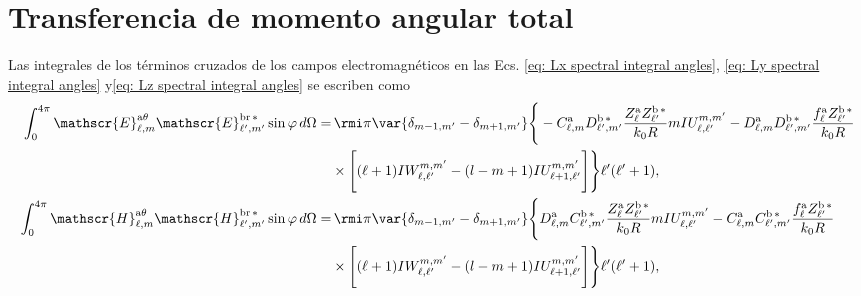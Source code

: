 \section{Transferencia de momento angular total}
Las integrales de los términos cruzados de los campos electromagnéticos en las Ecs. \eqref{eq: Lx spectral integral angles}, \eqref{eq: Ly spectral integral angles} y\eqref{eq: Lz spectral integral angles} se escriben como
\begin{align}
\int_{0}^{4\pi} \mathscr{E}_{\ell, m}^{\text{a}\theta}\mathscr{E}_{\ell^{\prime}, m^{\prime}}^{\text{br}\,*} \sin\varphi \, d\Omega =& 
%
\, \rmi \pi \var{ \delta_{m-1, m^{\prime}} - \delta_{m+1, m^{\prime}} } \Bigg\{-C_{\ell,m}^{\rm a}D_{\ell^{\prime}, m^{\prime}}^{\rm b \, *}\frac{Z_{\ell}^{\rm a}Z_{\ell^{\prime}}^{\rm b\, *}}{k_0 R} m IU_{\ell, \ell^{\prime}}^{m, m^{\prime}} 
%
-D_{\ell, m}^{\rm a}D_{\ell^{\prime}, m^{\prime}}^{\rm b \, *} \frac{f_{\ell}^{\rm a}Z_{\ell^{\prime}}^{\rm b \, *}}{k_0 R} \nonumber \\
%
& \times \Bigg[ (\ell+1) IW_{\ell, \ell^{\prime}}^{m, m^{\prime}} 
%
-(l-m+1) IU_{\ell + 1, \ell^{\prime}}^{m, m^{\prime}} \Bigg] \Bigg\}\ell^{\prime}(\ell^{\prime}+1),\\
%
%
\int_{0}^{4\pi} \mathscr{H}_{\ell, m}^{\text{a}\theta}\mathscr{H}_{\ell^{\prime}, m^{\prime}}^{\text{br}\,*} \sin\varphi \, d\Omega =& 
%
\, \rmi \pi \var{ \delta_{m-1, m^{\prime}} - \delta_{m+1, m^{\prime}} } \Bigg\{D_{\ell,m}^{\rm a}C_{\ell^{\prime}, m^{\prime}}^{\rm b \, *}\frac{Z_{\ell}^{\rm a}Z_{\ell^{\prime}}^{\rm b\, *}}{k_0 R} m IU_{\ell, \ell^{\prime}}^{m, m^{\prime}} 
%
-C_{\ell, m}^{\rm a}C_{\ell^{\prime}, m^{\prime}}^{\rm b \, *} \frac{f_{\ell}^{\rm a}Z_{\ell^{\prime}}^{\rm b \, *}}{k_0 R} \nonumber \\
%
& \times \Bigg[ (\ell+1) IW_{\ell, \ell^{\prime}}^{m, m^{\prime}} 
%
-(l-m+1) IU_{\ell + 1, \ell^{\prime}}^{m, m^{\prime}} \Bigg] \Bigg\}\ell^{\prime}(\ell^{\prime}+1),
%
%
%
%
\end{align}
\vspace{-0.8cm}
